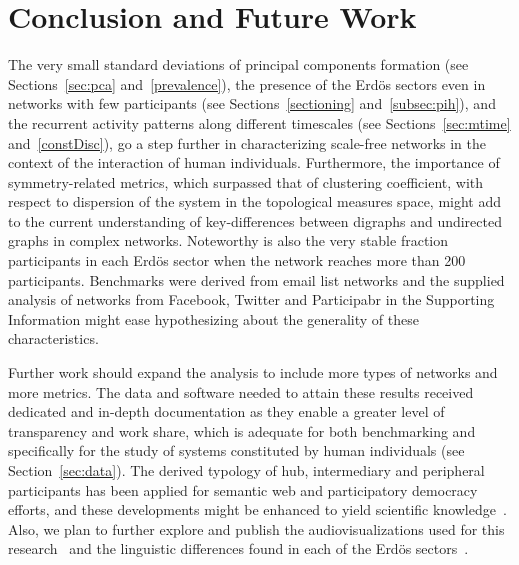 \chapter{Conclusion and Future Work}
\label{ch:concl}
The very small standard deviations of principal components formation
(see Sections~\ref{sec:pca} and~\ref{prevalence}),
the presence of the Erd\"os sectors even in networks with
few participants (see Sections~\ref{sectioning} and~\ref{subsec:pih}),
and the recurrent activity patterns along different timescales (see Sections~\ref{sec:mtime} and~\ref{constDisc}),
go a step further in characterizing scale-free networks in the context
of the interaction of human individuals.
Furthermore, the importance of symmetry-related metrics,
which surpassed that of clustering coefficient,
with respect to dispersion of the system in the topological measures space,
might add to the current understanding of key-differences between digraphs and
undirected graphs in complex networks.
Noteworthy is also the very stable fraction participants in each Erd\"os sector when the network reaches more than 200 participants.
Benchmarks were derived from email list networks
and the supplied analysis of
networks from Facebook,
Twitter and Participabr in the Supporting Information might ease hypothesizing
about the generality of these characteristics.

Further work should expand the analysis to include
more types of networks and more metrics.
The data and software needed to attain these results
received dedicated and in-depth
documentation as they enable a greater level of transparency
and work share,
which is adequate for both benchmarking
and specifically for the study of systems constituted
by human individuals (see Section~\ref{sec:data}).
The derived typology of hub, intermediary and peripheral participants
has been applied for semantic web and participatory democracy efforts,
and these developments might be enhanced to yield scientific knowledge~\cite{opa}.
Also, we plan to further explore and publish the audiovisualizations
used for this research~\cite{versinus,animacoes} and
the linguistic differences found in each of the Erd\"os sectors~\cite{rcText}.

